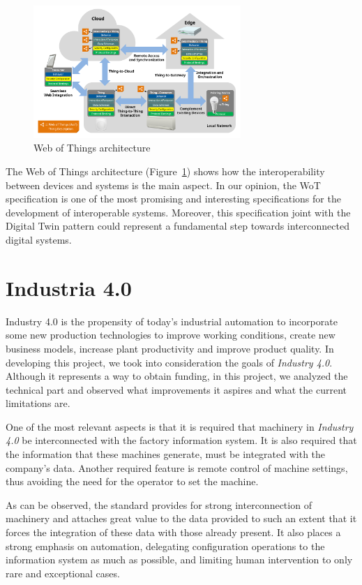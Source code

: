 \begin{figure}[h]
	\centering
	\includegraphics[width=0.7\textwidth]{img/wot.png}
	\caption{Web of Things architecture}
	\label{fig:iot}
\end{figure}

The Web of Things architecture (Figure~\ref{fig:iot}) shows how the interoperability between devices and systems is the main aspect.
In our opinion, the WoT specification is one of the most promising and interesting specifications for the development of interoperable systems.
Moreover, this specification joint with the Digital Twin pattern could represent a fundamental step towards interconnected digital systems.

\section{Industria 4.0}
Industry 4.0 is the propensity of today's industrial automation to incorporate some new production technologies to improve working conditions, create
new business models, increase plant productivity and improve product quality.
In developing this project, we took into consideration the goals of \textit{Industry 4.0}. Although it represents a way to obtain funding,
in this project, we analyzed the technical part and observed what improvements it aspires and what the current limitations are.


One of the most relevant aspects is that it is required that machinery in \textit{Industry 4.0} be interconnected with the factory information
system. It is also required that the information that these machines generate, must be integrated with the company's data.
Another required feature is remote control of machine settings, thus avoiding the need for the operator to set the machine.

As can be observed, the standard provides for strong interconnection of machinery and attaches great value to the data provided to such an extent that it forces the integration of these data with those already present. It also places a strong emphasis on automation, delegating configuration operations to the information system as much as possible, and limiting human intervention to only rare and exceptional cases.
